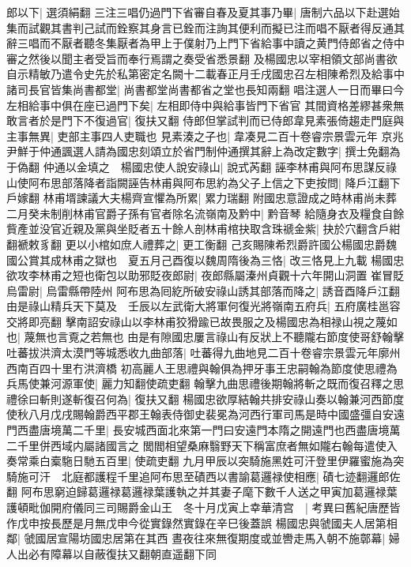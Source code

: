郎以下|{
	選須絹翻}
三注三唱仍過門下省審自春及夏其事乃畢|{
	唐制六品以下赴選始集而試觀其書判己試而銓察其身言已銓而注詢其便利而擬已注而唱不厭者得反通其辭三唱而不厭者聽冬集厭者為甲上于僕射乃上門下省給事中讀之黄門侍郎省之侍中審之然後以聞主者受旨而奉行焉謂之奏受省悉景翻}
及楊國忠以宰相領文部尚書欲自示精敏乃遣令史先於私第密定名闕十二載春正月壬戌國忠召左相陳希烈及給事中諸司長官皆集尚書都堂|{
	尚書都堂尚書都省之堂也長知兩翻}
唱注選人一日而畢曰今左相給事中俱在座已過門下矣|{
	左相即侍中與給事皆門下省官}
其間資格差繆甚衆無敢言者於是門下不復過官|{
	復扶又翻}
侍郎但掌試判而已侍郎韋見素張倚趨走門庭與主事無異|{
	吏部主事四人吏職也}
見素湊之子也|{
	韋凑見二百十卷睿宗景雲元年}
京兆尹鮮于仲通諷選人請為國忠刻頌立於省門制仲通撰其辭上為改定數字|{
	撰士免翻為于偽翻}
仲通以金填之　楊國忠使人說安祿山|{
	說式芮翻}
誣李林甫與阿布思謀反祿山使阿布思部落降者詣闕誣告林甫與阿布思約為父子上信之下吏按問|{
	降戶江翻下戶嫁翻}
林甫壻諫議大夫楊齊宣懼為所累|{
	累力瑞翻}
附國忠意證成之時林甫尚未葬二月癸未制削林甫官爵子孫有官者除名流嶺南及黔中|{
	黔音琴}
給隨身衣及糧食自餘貲產並没官近親及黨與坐貶者五十餘人剖林甫棺抉取含珠禠金紫|{
	抉於穴翻含戶紺翻褫敕豸翻}
更以小棺如庶人禮葬之|{
	更工衡翻}
己亥賜陳希烈爵許國公楊國忠爵魏國公賞其成林甫之獄也　夏五月己酉復以魏周隋後為三恪|{
	改三恪見上九載}
楊國忠欲攻李林甫之短也衛包以助邪貶夜郎尉|{
	夜郎縣屬溱州貞觀十六年開山洞置}
崔冒貶烏雷尉|{
	烏雷縣帶陸州}
阿布思為囘紇所破安祿山誘其部落而降之|{
	誘音酉降戶江翻}
由是祿山精兵天下莫及　壬辰以左武衛大將軍何復光將嶺南五府兵|{
	五府廣桂邕容交將即亮翻}
擊南詔安祿山以李林甫狡猾踰已故畏服之及楊國忠為相禄山視之蔑如也|{
	蔑無也言覔之若無也}
由是有隙國忠屢言祿山有反狀上不聽隴右節度使哥舒翰擊吐蕃拔洪濟太漠門等城悉收九曲部落|{
	吐蕃得九曲地見二百十卷睿宗景雲元年廓州西南百四十里冇洪濟橋}
初高麗人王思禮與翰俱為押牙事王忠嗣翰為節度使思禮為兵馬使兼河源軍使|{
	麗力知翻使疏吏翻}
翰擊九曲思禮後期翰將斬之既而復召釋之思禮徐曰斬則遂斬復召何為|{
	復扶又翻}
楊國忠欲厚結翰共排安祿山奏以翰兼河西節度使秋八月戊戌賜翰爵西平郡王翰表侍御史裴冕為河西行軍司馬是時中國盛彊自安遠門西盡唐境萬二千里|{
	長安城西面北來第一門曰安遠門本隋之開遠門也西盡唐境萬二千里併西域内屬諸國言之}
閭閻相望桑麻翳野天下稱富庶者無如隴右翰每遣使入奏常乘白槖駞日馳五百里|{
	使疏吏翻}
九月甲辰以突騎施黑姓可汗登里伊羅蜜施為突騎施可汗　北庭都護程千里追阿布思至磧西以書諭葛邏禄使相應|{
	磧七迹翻邏郎佐翻}
阿布思窮迫歸葛邏禄葛邏禄葉護執之并其妻子麾下數千人送之甲寅加葛邏禄葉護頓毗伽開府儀同三司賜爵金山王　冬十月戊寅上幸華清宫　|{
	考異曰舊紀唐歷皆作戊申按長歷是月無戊申今從實錄然實錄在辛巳後蓋誤}
楊國忠與虢國夫人居第相鄰|{
	虢國居宣陽坊國忠居第在其西}
晝夜往來無復期度或並轡走馬入朝不施鄣幕|{
	婦人出必有障幕以自蔽復扶又翻朝直遥翻下同}
